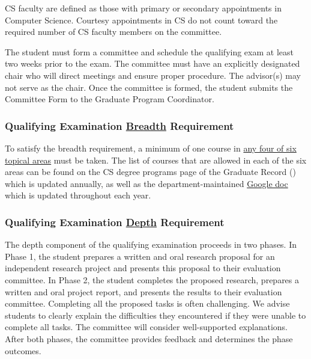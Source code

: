 CS faculty are defined as those with primary or secondary appointments in
Computer Science. Courtesy appointments in CS do not count toward the required
number of CS faculty members on the committee.

The student must form a committee and schedule the qualifying exam at least two
weeks prior to the exam. The committee must have an explicitly designated chair
who will direct meetings and ensure proper procedure. The advisor(s) may not
serve as the chair. Once the committee is formed, the student submits the
Committee Form to the Graduate Program Coordinator.





\hypertarget{qualifying-examination-breadth-requirement}{
\subsubsection{\texorpdfstring{Qualifying Examination \underline{Breadth} Requirement}{Qualifying Examination Breadth Requirement}}
\label{qualifying-examination-breadth-requirement}
}

To satisfy the breadth requirement, a minimum of one course in
\href{https://docs.google.com/document/d/1UztNiSjNeOGGoJ17v8-ehiHTHC3a2BT5Dy41ZWnVAkI}{any
four of six topical areas} must be taken.
The list of courses that are allowed in each of the six areas can be found on
the CS degree programs page of the Graduate Record ()
which is updated annually, as well as the department-maintained
\href{https://docs.google.com/document/d/1UztNiSjNeOGGoJ17v8-ehiHTHC3a2BT5Dy41ZWnVAkI/edit?tab=t.0\#heading=h.1m06ls4unej7}{{Google doc}}
which is updated throughout each year.


\hypertarget{qualifying-examination-depth-requirement}{
\subsubsection{\texorpdfstring{Qualifying Examination \underline{Depth} Requirement}{Qualifying Examination Depth Requirement}}
\label{qualifying-examination-depth-requirement}
}

The depth component of the qualifying examination proceeds in two phases. In
Phase 1, the student prepares a written and oral research proposal for an
independent research project and presents this proposal to their evaluation
committee. In Phase 2, the student completes the proposed research, prepares a
written and oral project report, and presents the results to their evaluation
committee. Completing all the proposed tasks is often challenging. We advise
students to clearly explain the difficulties they encountered if they were
unable to complete all tasks. The committee will consider well-supported
explanations. After both phases, the committee provides feedback and determines
the phase outcomes.


